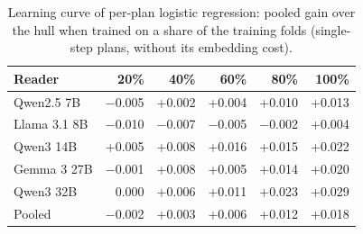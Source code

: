 \begin{table}[t]
\centering\small
\setlength{\tabcolsep}{4pt}
\caption{Learning curve of per-plan logistic regression: pooled gain over the hull when trained on a share of the training folds (single-step plans, without its embedding cost).}
\label{tab:review_curve}
\begin{tabular*}{\linewidth}{@{\extracolsep{\fill}}lrrrrr}
\toprule
Reader & 20\% & 40\% & 60\% & 80\% & 100\% \\
\midrule
Qwen2.5 7B & $-$0.005 & +0.002 & +0.004 & +0.010 & +0.013 \\
Llama 3.1 8B & $-$0.010 & $-$0.007 & $-$0.005 & $-$0.002 & +0.004 \\
Qwen3 14B & +0.005 & +0.008 & +0.016 & +0.015 & +0.022 \\
Gemma 3 27B & $-$0.001 & +0.008 & +0.005 & +0.014 & +0.020 \\
Qwen3 32B & 0.000 & +0.006 & +0.011 & +0.023 & +0.029 \\
Pooled & $-$0.002 & +0.003 & +0.006 & +0.012 & +0.018 \\
\bottomrule
\end{tabular*}
\end{table}
